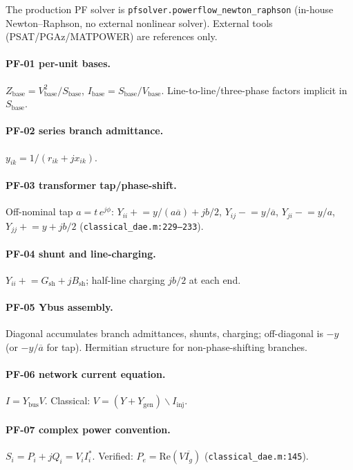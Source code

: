 \documentclass[12pt,a4paper]{article}
\begin{document}
The production PF solver is \texttt{pfsolver.powerflow\_newton\_raphson}
(in-house Newton--Raphson, no external nonlinear solver). External tools
(PSAT/PGAz/MATPOWER) are references only.

\paragraph{PF-01 per-unit bases.}
$Z_{\mathrm{base}}=V_{\mathrm{base}}^2/S_{\mathrm{base}}$,
$I_{\mathrm{base}}=S_{\mathrm{base}}/V_{\mathrm{base}}$.
Line-to-line/three-phase factors implicit in $S_{\mathrm{base}}$.

\paragraph{PF-02 series branch admittance.}
$y_{ik}=1/(r_{ik}+jx_{ik})$.

\paragraph{PF-03 transformer tap/phase-shift.}
Off-nominal tap $a=t\,e^{j\phi}$:
$Y_{ii}\mathrel{+}=y/(a\overline{a})+jb/2$,
$Y_{ij}\mathrel{-}=y/\overline{a}$,
$Y_{ji}\mathrel{-}=y/a$,
$Y_{jj}\mathrel{+}=y+jb/2$
(\texttt{classical\_dae.m:229--233}).

\paragraph{PF-04 shunt and line-charging.}
$Y_{ii}\mathrel{+}=G_{\mathrm{sh}}+jB_{\mathrm{sh}}$; half-line charging
$jb/2$ at each end.

\paragraph{PF-05 Ybus assembly.}
Diagonal accumulates branch admittances, shunts, charging; off-diagonal is
$-y$ (or $-y/\overline{a}$ for tap). Hermitian structure for non-phase-shifting
branches.

\paragraph{PF-06 network current equation.}
$I=Y_{\mathrm{bus}}V$. Classical: $V=(Y{+}Y_{\mathrm{gen}})\backslash I_{\mathrm{inj}}$.

\paragraph{PF-07 complex power convention.}
$S_i=P_i+jQ_i=V_i I_i^*$. Verified: $P_e=\mathrm{Re}(V\overline{I_g})$
(\texttt{classical\_dae.m:145}).
\end{document}
